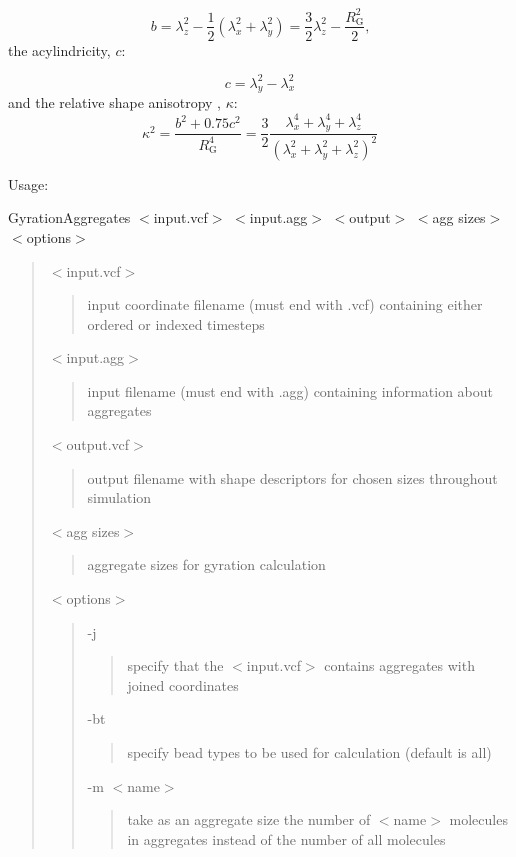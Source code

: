 \begin{equation}
  b = \lambda_z^2 - \frac{1}{2} \left( \lambda_x^2 + \lambda_y^2 \right) = \frac{3}{2} \lambda_z^2 - \frac{R_{\mathrm{G}}^2}{2} \mbox{,}
\end{equation}
 the acylindricity, $c$:

\begin{equation}
  c = \lambda_y^2 - \lambda_x^2
\end{equation}
 and the relative shape anisotropy , $\kappa$:
\begin{equation}
  \kappa^2 = \frac{b^2 + 0.75 c^2}{R_{\mathrm{G}}^4} = \frac{3}{2}
  \frac{\lambda_x^4 + \lambda_y^4 + \lambda_z^4}{\left( \lambda_x^2 +
  \lambda_y^2 + \lambda_z^2 \right)^2}
\end{equation}


Usage\+:

{\ttfamily Gyration\+Aggregates $<$input.\+vcf$>$ $<$input.\+agg$>$ $<$output$>$ $<$agg sizes$>$ $<$options$>$}

\begin{quote}
{\ttfamily $<$input.\+vcf$>$} \begin{quote}
input coordinate filename (must end with {\ttfamily .vcf}) containing either ordered or indexed timesteps \end{quote}
{\ttfamily $<$input.\+agg$>$} \begin{quote}
input filename (must end with {\ttfamily .agg}) containing information about aggregates \end{quote}
{\ttfamily $<$output.\+vcf$>$} \begin{quote}
output filename with shape descriptors for chosen sizes throughout simulation \end{quote}
{\ttfamily $<$agg sizes$>$} \begin{quote}
aggregate sizes for gyration calculation \end{quote}
{\ttfamily $<$options$>$} \begin{quote}
{\ttfamily -\/j} \begin{quote}
specify that the {\ttfamily $<$input.\+vcf$>$} contains aggregates with joined coordinates \end{quote}
{\ttfamily -\/bt} \begin{quote}
specify bead types to be used for calculation (default is all) \end{quote}
{\ttfamily -\/m $<$name$>$} \begin{quote}
take as an aggregate size the number of {\ttfamily $<$name$>$} molecules in aggregates instead of the number of all molecules \end{quote}
\end{quote}
\end{quote}


